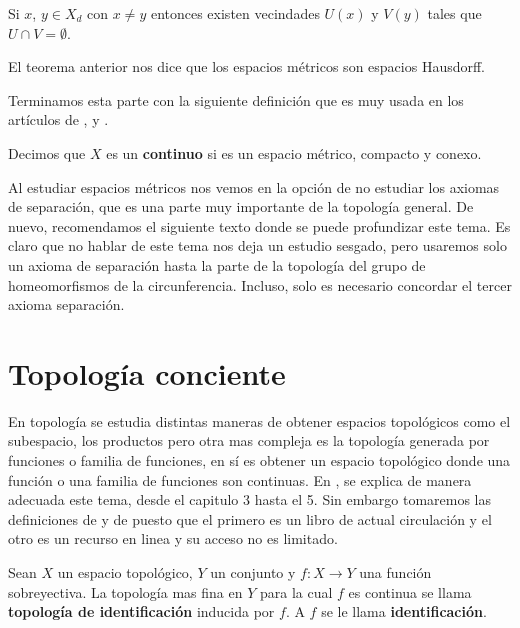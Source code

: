
\begin{te}
Si $x$, $y \in X_{d}$ con $ x\neq y $ entonces existen vecindades $U(x)$ y $V(y)$ tales que $U \cap V=\emptyset$.
\end{te}

\begin{ob}\label{obs:espacios-metricos-son-hausdorff}
El teorema anterior nos dice que los espacios métricos son espacios Hausdorff.
\end{ob}

Terminamos esta parte con la siguiente definición que es muy usada en los artículos de \cite{kras}, \cite{why} y \cite{moore}.

\begin{df}
Decimos que $X$ es un \textbf{continuo} si es un espacio métrico, compacto y conexo.
\end{df}

Al estudiar espacios métricos nos vemos en la opción de no estudiar los axiomas de separación, que es una parte muy importante de la topología general. De nuevo, recomendamos el siguiente texto donde se puede profundizar este tema. Es claro que no hablar de este tema nos deja un estudio sesgado, pero usaremos solo un axioma de separación hasta la parte de la topología del grupo de homeomorfismos de la circunferencia. Incluso, solo es necesario concordar el tercer axioma separación. 


\section*{Topología conciente}

En topología se estudia distintas maneras de obtener espacios topológicos como el subespacio, los productos pero otra mas compleja es la topología generada por funciones o familia de funciones, en sí es obtener un espacio topológico donde una función o una familia de funciones son continuas. En \cite{top_salicrup}, se explica de manera adecuada este tema, desde el capitulo 3 hasta el 5. Sin embargo tomaremos las definiciones de \cite{top_prieto} y de \cite{top_juan} puesto que el primero es un libro de actual circulación y el otro es un recurso en linea y su acceso no es limitado. 

\begin{df}
Sean $X$ un espacio topológico, $Y$ un conjunto y $f:X \to Y$ una función sobreyectiva. La topología mas fina en $Y$ para la cual $f$ es continua se llama \textbf{topología de identificación} inducida por $f$. A $f$ se le llama \textbf{identificación}.
\end{df}


